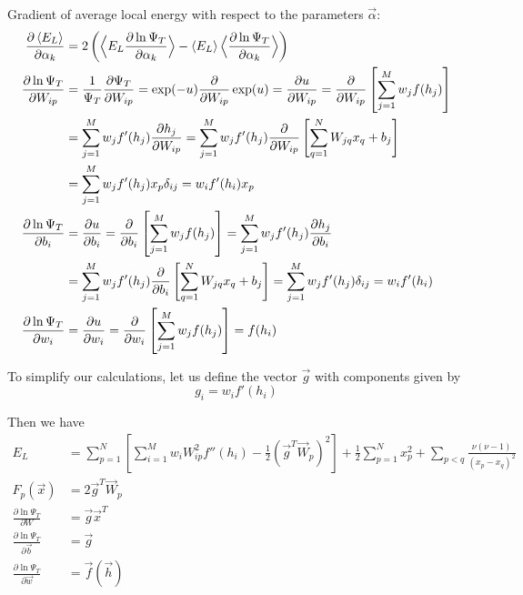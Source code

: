 \documentclass[12pt]{article}
\begin{document}
\noindent Gradient of average local energy with respect to the parameters $\vec{\alpha}$:
\begin{align*}
\frac{\partial \braket{E_L}}{\partial \alpha_k} &= 2 \left( \Big\langle E_L \frac{\partial \ln \Psi_T}{\partial \alpha_k} \Big\rangle - \braket{E_L} \Big\langle \frac{\partial \ln \Psi_T}{\partial \alpha_k} \Big\rangle \right)\\
%
\frac{\partial \ln \Psi_T}{\partial W_{ip}} &= \frac{1}{\Psi_T} \frac{\partial \Psi_T}{\partial W_{ip}} = \exp(-u) \frac{\partial}{\partial W_{ip}} \exp(u) = \frac{\partial u}{\partial W_{ip}}=\frac{\partial }{\partial W_{ip}} \left[ \sum_{j=1}^M w_j f(h_j) \right] \\
&= \sum_{j=1}^M w_j f'(h_j)\frac{\partial h_j}{\partial W_{ip}}= \sum_{j=1}^M w_j f'(h_j)\frac{\partial }{\partial W_{ip}}\left[ \sum_{q=1}^N W_{jq}x_q +b_j \right]\\
&= \sum_{j=1}^M w_j f'(h_j)x_p\delta_{ij} = w_i f'(h_i) x_p \\
%
\frac{\partial \ln \Psi_T}{\partial b_i} &= \frac{\partial u}{\partial b_i}=  \frac{\partial}{\partial b_i} \left[ \sum_{j=1}^M w_j f(h_j) \right]  = \sum_{j=1}^M w_j f'(h_j) \frac{\partial h_j}{\partial b_i}\\
&= \sum_{j=1}^M w_j f'(h_j) \frac{\partial}{\partial b_i}  \left[ \sum_{q=1}^N W_{jq}x_q +b_j \right] = \sum_{j=1}^M w_j f'(h_j) \delta_{ij} = w_i f'(h_i) \\
%
\frac{\partial \ln \Psi_T}{\partial w_i} &= \frac{\partial u}{\partial w_i}=  \frac{\partial}{\partial w_i} \left[ \sum_{j=1}^M w_j f(h_j) \right]  = f(h_i)\\
\end{align*}

\noindent To simplify our calculations, let us define the vector $\vec{g}$ with components given by
\begin{equation}
g_i = w_i f'(h_i)
\end{equation}

\noindent Then we have
\begin{align*}
E_L &=  \sum_{p=1}^{N} \left[   \sum_{i=1}^M w_i W_{ip}^2 f''(h_i) -\frac{1}{2}  \left( \vec{g}^T \vec{W}_p \right)^2 \right]  +  \frac{1}{2} \sum_{p=1}^{N}  x_p^2  + \sum_{p<q} \frac{\nu (\nu -1)}{(x_p-x_q)^2}\\
%
F_p(\vec{x}) &= 2 \vec{g}^T \vec{W}_p\\
%
\frac{\partial \ln \Psi_T}{\partial W} &= \vec{g}\vec{x}^T\\
%
\frac{\partial \ln \Psi_T}{\partial \vec{b}} &= \vec{g}\\
 \frac{\partial \ln \Psi_T}{\partial \vec{w}} &= \vec{f}(\vec{h})\\ 
\end{align*}
\end{document}
